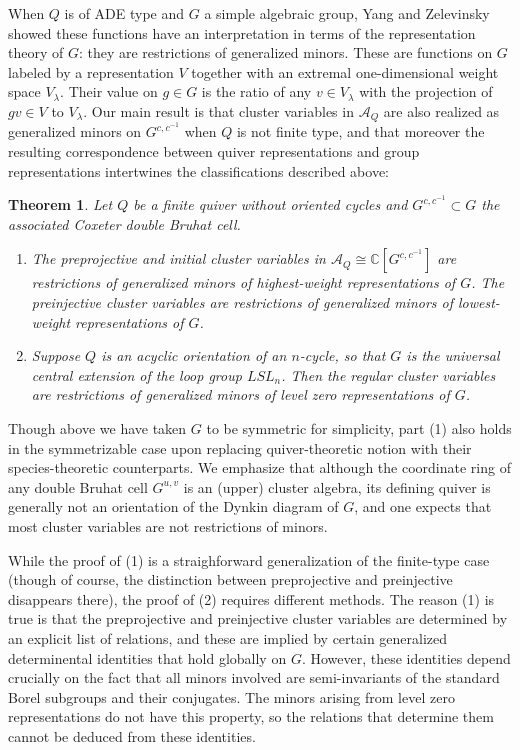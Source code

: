 \documentclass[12pt]{amsart}
\newcommand{\cA}{\mathcal{A}}
\newcommand{\CC}{\mathbb{C}}
\newtheorem{theorem}{Theorem}[section]
\numberwithin{equation}{section}
\begin{document}
When $Q$ is of ADE type and $G$ a simple algebraic group, Yang and Zelevinsky showed these functions have an interpretation in terms of the representation theory of $G$: they are restrictions of generalized minors. 
These are functions on $G$ labeled by a representation $V$ together with an extremal one-dimensional weight space $V_\lambda$. 
Their value on $g \in G$ is the ratio of any $v \in V_\lambda$ with the projection of $gv \in V$ to $V_\lambda$. 
Our main result is that cluster variables in $\cA_Q$ are also realized as generalized minors on $G^{c,c^{-1}}$ when $Q$ is not finite type, and that moreover the resulting correspondence between quiver representations and group representations intertwines the classifications described above: 

\begin{theorem}\label{thm:maintheorem}
Let $Q$ be a finite quiver without oriented cycles and $G^{c,c^{-1}} \subset G$ the associated Coxeter double Bruhat cell.
\begin{enumerate}
\item The preprojective and initial cluster variables in $\cA_Q \cong \CC[G^{c,c^{-1}}]$ are restrictions of generalized minors of highest-weight representations of $G$. The preinjective cluster variables are restrictions of generalized minors of lowest-weight representations of $G$.
\item Suppose $Q$ is an acyclic orientation of an $n$-cycle, so that $G$ is the universal central extension of the loop group $LSL_{n}$. Then the regular cluster variables are restrictions of generalized minors of level zero representations of $G$.
\end{enumerate}
\end{theorem}

Though above we have taken $G$ to be symmetric for simplicity, part (1) also holds in the symmetrizable case upon replacing quiver-theoretic notion with their species-theoretic counterparts. 
We emphasize that although the coordinate ring of any double Bruhat cell $G^{u,v}$ is an (upper) cluster algebra, its defining quiver is generally not an orientation of the Dynkin diagram of $G$, and one expects that most cluster variables are not restrictions of minors.

While the proof of (1) is a straighforward generalization of the finite-type case (though of course, the distinction between preprojective and preinjective disappears there), the proof of (2) requires different methods. 
The reason (1) is true is that the preprojective and preinjective cluster variables are determined by an explicit list of relations, and these are implied by certain generalized determinental identities that hold globally on $G$. 
However, these identities depend crucially on the fact that all minors involved are semi-invariants of the standard Borel subgroups and their conjugates. 
The minors arising from level zero representations do not have this property, so the relations that determine them cannot be deduced from these identities.
\end{document}
